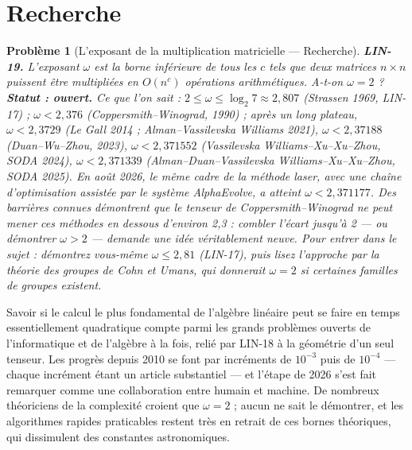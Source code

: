 \documentclass[11pt]{article}
\newtheorem{problem}{Problème}
\begin{document}
\bigskip


\section*{Recherche}

\begin{problem}[{L'exposant de la multiplication matricielle --- Recherche}]
\textbf{LIN-19.} L'exposant $\omega$ est la borne inférieure de tous les $c$
tels que deux matrices $n \times n$ puissent être multipliées en $O(n^c)$ opérations
arithmétiques. A-t-on $\omega = 2$ ? \textbf{Statut : ouvert.} Ce que l'on sait :
$2 \le \omega \le \log_2 7 \approx 2{,}807$ (Strassen 1969, LIN-17) ; $\omega < 2{,}376$
(Coppersmith--Winograd, 1990) ; après un long plateau, $\omega < 2{,}3729$ (Le Gall 2014 ;
Alman--Vassilevska Williams 2021), $\omega < 2{,}37188$ (Duan--Wu--Zhou, 2023),
$\omega < 2{,}371552$ (Vassilevska Williams--Xu--Xu--Zhou, SODA 2024), $\omega < 2{,}371339$
(Alman--Duan--Vassilevska Williams--Xu--Xu--Zhou, SODA 2025). En août 2026, le même cadre de la méthode
laser, avec une chaîne d'optimisation assistée par le système AlphaEvolve, a atteint
$\omega < 2{,}371177$. Des barrières connues démontrent que le tenseur de Coppersmith--Winograd ne
peut mener ces méthodes en dessous d'environ 2,3 : combler l'écart jusqu'à 2 --- ou démontrer
$\omega > 2$ --- demande une idée véritablement neuve. Pour entrer dans le sujet : démontrez
vous-même $\omega \le 2{,}81$ (LIN-17), puis lisez l'approche par la théorie des groupes de Cohn et
Umans, qui donnerait $\omega = 2$ si certaines familles de groupes existent.
\end{problem}

\noindent Savoir si le calcul le plus fondamental de l'algèbre linéaire peut se faire en
temps essentiellement quadratique compte parmi les grands problèmes ouverts de l'informatique et de
l'algèbre à la fois, relié par LIN-18 à la géométrie d'un seul tenseur. Les progrès depuis 2010 se
font par incréments de $10^{-3}$ puis de $10^{-4}$ --- chaque incrément étant un article
substantiel --- et l'étape de 2026 s'est fait remarquer comme une collaboration entre humain et
machine. De nombreux théoriciens de la complexité croient que $\omega = 2$ ; aucun ne sait le
démontrer, et les algorithmes rapides praticables restent très en retrait de ces bornes théoriques,
qui dissimulent des constantes astronomiques.
\end{document}
